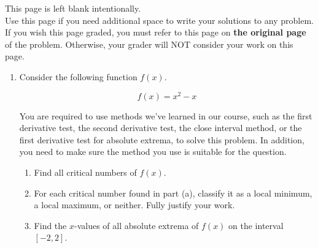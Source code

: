 \documentclass[11pt]{article}
\begin{document}
{    }

\vfill


\newpage

This page is left blank intentionally.\\

Use this page if you need additional space to write your solutions to any problem. \\

If you wish this page graded, you must refer to this page on \textbf{the original page} of the problem. Otherwise, your grader will NOT consider your work on this page.

\newpage%


\begin{enumerate}


\item Consider the following function $f(x)$.

\[f(x)=x^2 - x\]%


You are required to use methods we've learned in our course, such as the first derivative test, the second derivative test, the close interval method, or the first derivative test for absolute extrema, to solve this problem. In addition, you need to make sure the method you use is suitable for the question.

\begin{enumerate}
    \item Find all critical numbers of $f(x)$.

    \vfill

    \item For each critical number found in part (a), classify it as a local minimum, a local maximum, or neither. Fully justify your work.

    \vfill
    \vfill
    \vfill

    \item Find the $x$-values of all absolute extrema of $f(x)$ on the interval $[-2, 2]$.

    \vfill
    \vfill
    \vfill
\end{enumerate}



\end{enumerate}
\end{document}
